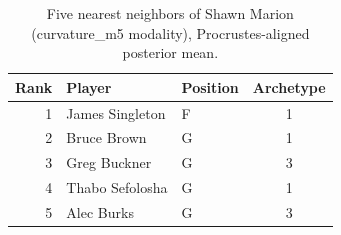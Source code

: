 \begin{table}[htbp]
  \centering\small
  \begin{tabular}{rllc}
    \toprule
    Rank & Player & Position & Archetype \\
    \midrule
    1 & James Singleton & F & 1 \\
    2 & Bruce Brown & G & 1 \\
    3 & Greg Buckner & G & 3 \\
    4 & Thabo Sefolosha & G & 1 \\
    5 & Alec Burks & G & 3 \\
    \bottomrule
  \end{tabular}
  \caption{Five nearest neighbors of Shawn Marion (curvature_m5 modality), Procrustes-aligned posterior mean.}
  \label{tab:Shawn_Marion_neighbors_curvature_m5}
\end{table}

